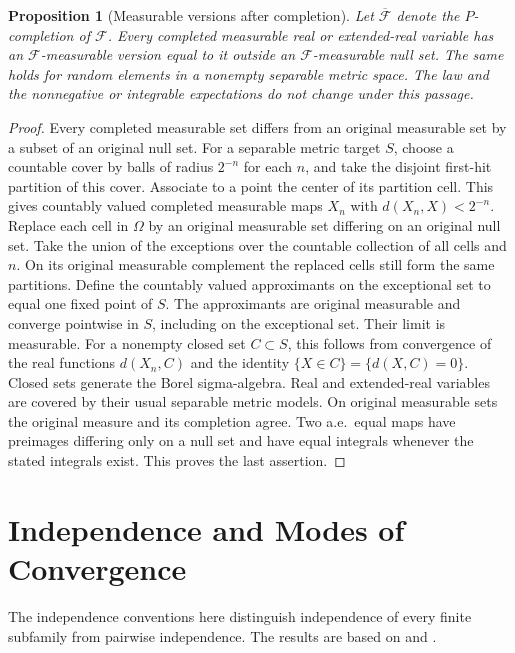 \documentclass[11pt,oneside,openany]{book}
\theoremstyle{plain}
\newtheorem{proposition}[theorem]{Proposition}
\theoremstyle{definition}
\theoremstyle{remark}
\begin{document}
\begin{proposition}[Measurable versions after completion]
\label{thm:prob-completed-version}
Let \(\overline{\mathcal F}\) denote the \(P\)-completion of
\(\mathcal F\). Every completed measurable real or extended-real
variable has an \(\mathcal F\)-measurable version equal to it outside
an \(\mathcal F\)-measurable null set. The same holds for random elements
in a nonempty separable metric space. The law and the nonnegative or
integrable expectations do not change under this passage.
\end{proposition}
\begin{proof}
Every completed measurable set differs from an original measurable
set by a subset of an original null set. For a separable metric target
\(S\), choose a countable cover by balls of radius \(2^{-n}\) for
each \(n\), and take the disjoint first-hit partition of this cover.
Associate to a point the center of its partition cell. This gives
countably valued completed measurable maps \(X_n\) with
\(d(X_n,X)<2^{-n}\). Replace each cell in \(\Omega\) by an original
measurable set differing on an original null set. Take the union of
the exceptions over the countable collection of all cells and \(n\).
On its original measurable complement the replaced cells still form
the same partitions. Define the countably valued approximants on the
exceptional set to equal one fixed point of \(S\). The approximants are
original measurable and converge pointwise in \(S\), including on
the exceptional set. Their limit is measurable. For a nonempty closed
set \(C\subset S\), this follows from convergence of the real
functions \(d(X_n,C)\) and the identity
\(\{X\in C\}=\{d(X,C)=0\}\). Closed sets generate the Borel
sigma-algebra. Real and extended-real variables are covered by their
usual separable metric models. On original measurable sets the original
measure and its completion agree. Two a.e.\ equal maps have preimages
differing only on a null set and have equal integrals whenever the
stated integrals exist. This proves the last assertion.
\end{proof}
\chapter{Independence and Modes of Convergence}
\label{chap:probability-independence}

The independence conventions here distinguish independence of every finite
subfamily from pairwise independence. The results are based on
\cite[Theorems 4.6--4.18 and Chapter 5]{Kallenberg} and
\cite[Sections 2.1, 2.3, and 2.5]{Durrett}.
\end{document}
